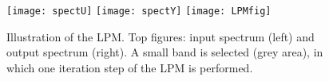 \begin{figure}[htb] %
   \centering
   \texttt{[image: spectU]} 
   \texttt{[image: spectY]} 
   \texttt{[image: LPMfig]} 
   \caption{Illustration of the LPM. Top figures: input spectrum (left) and output spectrum (right). A small band is selected (grey area), in which one iteration step of the LPM is performed.}
   \label{LPM_Schematic_EG}
\end{figure}